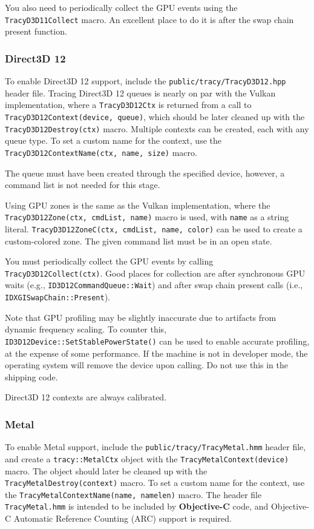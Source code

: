 \documentclass[hidelinks,titlepage,a4paper,twoside]{article}
\begin{document}
You also need to periodically collect the GPU events using the \texttt{TracyD3D11Collect} macro. An excellent place to do it is after the swap chain present function.

\subsubsection{Direct3D 12}

To enable Direct3D 12 support, include the \texttt{public/tracy/TracyD3D12.hpp} header file. Tracing Direct3D 12 queues is nearly on par with the Vulkan implementation, where a \texttt{TracyD3D12Ctx} is returned from a call to \texttt{TracyD3D12Context(device, queue)}, which should be later cleaned up with the \texttt{TracyD3D12Destroy(ctx)} macro. Multiple contexts can be created, each with any queue type. To set a custom name for the context, use the \texttt{TracyD3D12ContextName(ctx, name, size)} macro.

The queue must have been created through the specified device, however, a command list is not needed for this stage.

Using GPU zones is the same as the Vulkan implementation, where the \texttt{TracyD3D12Zone(ctx, cmdList, name)} macro is used, with \texttt{name} as a string literal. \texttt{TracyD3D12ZoneC(ctx, cmdList, name, color)} can be used to create a custom-colored zone. The given command list must be in an open state.

You must periodically collect the GPU events by calling \texttt{TracyD3D12Collect(ctx)}. Good places for collection are after synchronous GPU waits (e.g., \texttt{ID3D12CommandQueue::Wait}) and after swap chain present calls (i.e., \texttt{IDXGISwapChain::Present}).

Note that GPU profiling may be slightly inaccurate due to artifacts from dynamic frequency scaling. To counter this, \texttt{ID3D12Device::SetStablePowerState()} can be used to enable accurate profiling, at the expense of some performance. If the machine is not in developer mode, the operating system will remove the device upon calling. Do not use this in the shipping code.

Direct3D 12 contexts are always calibrated.

\subsubsection{Metal}

To enable Metal support, include the \texttt{public/tracy/TracyMetal.hmm} header file, and create a \texttt{tracy::MetalCtx} object with the \texttt{TracyMetalContext(device)} macro. The object should later be cleaned up with the \texttt{TracyMetalDestroy(context)} macro. To set a custom name for the context, use the \texttt{TracyMetalContextName(name, namelen)} macro. The header file \texttt{TracyMetal.hmm} is intended to be included by \textbf{Objective-C} code, and Objective-C Automatic Reference Counting (ARC) support is required.
\end{document}
